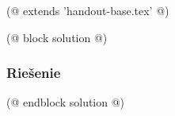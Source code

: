 (@ extends 'handout-base.tex' @)

(@ block solution @)
    \subsubsection{Riešenie}
    
(@ endblock solution @)

